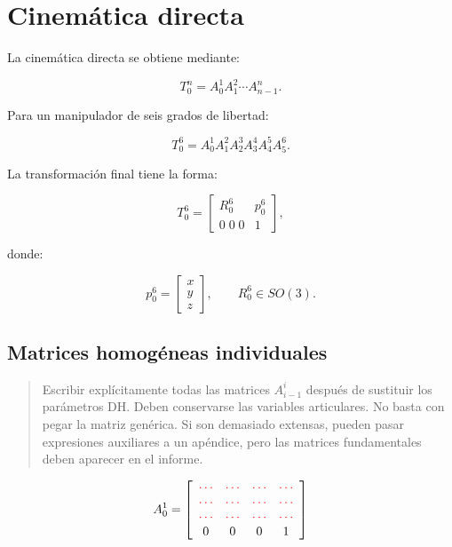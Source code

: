 \documentclass[journal]{IEEEtran}
\newcommand{\instr}[1]{%
\begin{quote}
\small
\noindent\textbf{\color{blue}{INSTRUCCIÓN:}} #1
\end{quote}
}
\begin{document}
\section{Cinemática directa}

La cinemática directa se obtiene mediante:

\begin{equation}
T_0^n =
A_0^1 A_1^2 \cdots A_{n-1}^{n}.
\label{eq:fk}
\end{equation}

Para un manipulador de seis grados de libertad:

\begin{equation}
T_0^6 =
A_0^1 A_1^2 A_2^3 A_3^4 A_4^5 A_5^6.
\end{equation}

La transformación final tiene la forma:

\begin{equation}
T_0^6 =
\begin{bmatrix}
R_0^6 & p_0^6 \\
0\;0\;0 & 1
\end{bmatrix},
\end{equation}

donde:

\begin{equation}
p_0^6 =
\begin{bmatrix}
x\\y\\z
\end{bmatrix},
\qquad
R_0^6 \in SO(3).
\end{equation}

\subsection{Matrices homogéneas individuales}

\instr{Escribir explícitamente todas las matrices $A_{i-1}^{i}$ después de sustituir los parámetros DH. Deben conservarse las variables articulares. No basta con pegar la matriz genérica. Si son demasiado extensas, pueden pasar expresiones auxiliares a un apéndice, pero las matrices fundamentales deben aparecer en el informe.}

\begin{equation}
A_0^1 =
\left[\begin{array}{cccc}
\color{red}\cdots & \color{red}\cdots & \color{red}\cdots & \color{red}\cdots\\
\color{red}\cdots & \color{red}\cdots & \color{red}\cdots & \color{red}\cdots\\
\color{red}\cdots & \color{red}\cdots & \color{red}\cdots & \color{red}\cdots\\
0 & 0 & 0 & 1
\end{array}\right]
\end{equation}
\end{document}
